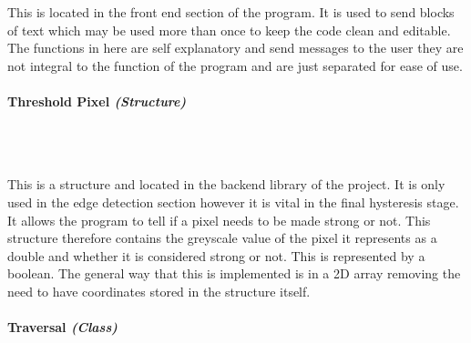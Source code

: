 \begin{FlushLeft}
    This is located in the front end section of the program. It is used to send blocks of text which may be used more than once to keep the code clean and editable. The functions in here are self explanatory and send messages to the user they are not integral to the function of the program and are just separated for ease of use. \\ 

    \bk

    \pagebreak
\paragraph{Threshold Pixel \textit{(Structure)}} \mbox{} \\

    \begin{figure}[H]
        \centering
    \end{figure}\\

    This is a structure and located in the backend library of the project. It is only used in the edge detection section however it is vital in the final hysteresis stage. It allows the program to tell if a pixel needs to be made strong or not. This structure therefore contains the greyscale value of the pixel it represents as a double and whether it is considered strong or not. This is represented by a boolean. The general way that this is implemented is in a 2D array removing the need to have coordinates stored in the structure itself.

    \bk

    \pagebreak
\paragraph{Traversal \textit{(Class)}} \mbox{} \\


\end{FlushLeft}
